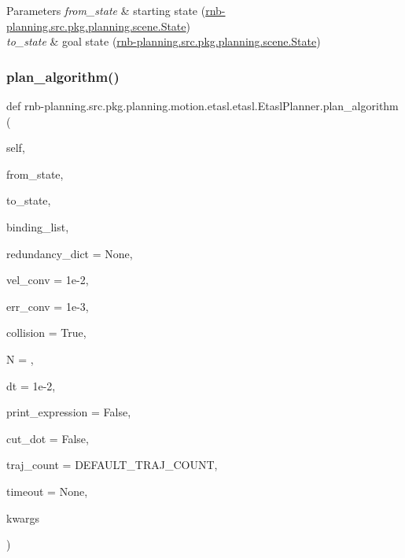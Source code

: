 \begin{DoxyParams}{Parameters}
{\em from\+\_\+state} & starting state (\hyperlink{classrnb-planning_1_1src_1_1pkg_1_1planning_1_1scene_1_1_state}{rnb-\/planning.\+src.\+pkg.\+planning.\+scene.\+State}) \\
\hline
{\em to\+\_\+state} & goal state (\hyperlink{classrnb-planning_1_1src_1_1pkg_1_1planning_1_1scene_1_1_state}{rnb-\/planning.\+src.\+pkg.\+planning.\+scene.\+State}) \\
\hline
\end{DoxyParams}
\mbox{\label{classrnb-planning_1_1src_1_1pkg_1_1planning_1_1motion_1_1etasl_1_1etasl_1_1_etasl_planner_a4e26195165d7114157e2cb1a53671a6e}} 
\subsubsection{\texorpdfstring{plan\+\_\+algorithm()}{plan\_algorithm()}}
{\footnotesize\ttfamily def rnb-\/planning.\+src.\+pkg.\+planning.\+motion.\+etasl.\+etasl.\+Etasl\+Planner.\+plan\+\_\+algorithm (\begin{DoxyParamCaption}\item[{}]{self,  }\item[{}]{from\+\_\+state,  }\item[{}]{to\+\_\+state,  }\item[{}]{binding\+\_\+list,  }\item[{}]{redundancy\+\_\+dict = {\ttfamily None},  }\item[{}]{vel\+\_\+conv = {\ttfamily 1e-\/2},  }\item[{}]{err\+\_\+conv = {\ttfamily 1e-\/3},  }\item[{}]{collision = {\ttfamily True},  }\item[{}]{N = {},  }\item[{}]{dt = {\ttfamily 1e-\/2},  }\item[{}]{print\+\_\+expression = {\ttfamily False},  }\item[{}]{cut\+\_\+dot = {\ttfamily False},  }\item[{}]{traj\+\_\+count = {\ttfamily DEFAULT\+\_\+TRAJ\+\_\+COUNT},  }\item[{}]{timeout = {\ttfamily None},  }\item[{}]{kwargs }\end{DoxyParamCaption})}



